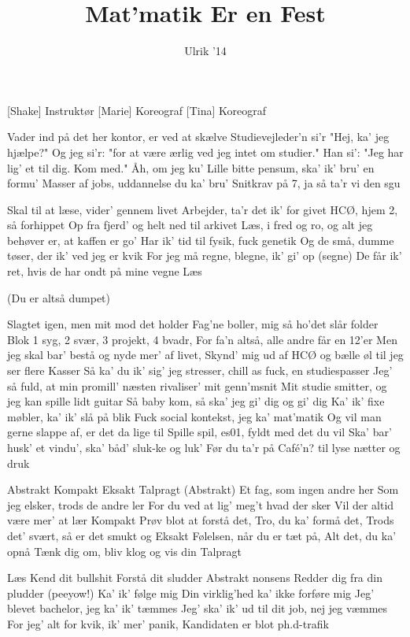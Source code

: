 \documentclass[a4paper,11pt]{article}
\title{Mat'matik Er en Fest}
\author{Ulrik '14}
\begin{document}
\maketitle

\begin{roles}
[Shake] Instruktør
[Marie] Koreograf
[Tina] Koreograf
\end{roles}

\begin{song}
 Vader ind på det her kontor, er ved at skælve
Studievejleder'n si'r "Hej, ka' jeg hjælpe?"
Og jeg si'r: "for at være ærlig ved jeg intet om studier."
Han si': "Jeg har lig' et til dig. Kom med."
Åh, om jeg ku'
Lille bitte pensum, ska' ik' bru' en formu'
Masser af jobs, uddannelse du ka' bru'
Snitkrav på 7, ja så ta'r vi den sgu

 Skal til at læse, vider' gennem livet
Arbejder, ta'r det ik' for givet
HCØ, hjem 2, så forhippet
Op fra fjerd' og helt ned til arkivet
Læs, i fred og ro, og alt jeg behøver er, at kaffen er go' 
Har ik' tid til fysik, fuck genetik
Og de små, dumme tøser, der ik' ved jeg er kvik
For jeg må regne, blegne, ik' gi' op (segne)
De får ik' ret, hvis de har ondt på mine vegne
Læs

 (Du er altså dumpet)

 Slagtet igen, men mit mod det holder
Fag'ne boller, mig så ho'det slår folder
Blok 1 syg, 2 svær, 3 projekt, 4 bvadr,
For fa'n altså, alle andre får en 12'er
Men jeg skal bar' bestå og nyde mer' af livet,
Skynd' mig ud af HCØ og bælle øl til jeg ser flere Kasser
Så ka' du ik' sig' jeg stresser, chill as fuck, en studiespasser
Jeg' så fuld, at min promill' næsten rivaliser' mit genn'msnit
Mit studie smitter, og jeg kan spille lidt guitar
Så baby kom, så ska’ jeg gi’ dig og gi’ dig
Ka' ik' fixe møbler, ka' ik' slå på blik
Fuck social kontekst, jeg ka' mat'matik
Og vil man gerne slappe af, er det da lige til
Spille spil, es01, fyldt med det du vil
Ska' bar' husk' et vindu', ska' båd' sluk-ke og luk'
Før du ta'r på Café'n? til lyse nætter og druk

 Abstrakt
Kompakt
Eksakt
Talpragt (Abstrakt)
Et fag, som ingen andre her
Som jeg elsker, trods de andre ler
For du ved at lig’ meg’t hvad der sker
Vil der altid være mer’ at lær
Kompakt
Prøv blot at forstå det,
Tro, du ka' formå det,
Trods det’ svært, så er det smukt og
Eksakt
Følelsen, når du er tæt på,
Alt det, du ka’ opnå
Tænk dig om, bliv klog og vis din
Talpragt

 Læs
Kend dit bullshit
Forstå dit sludder
Abstrakt nonsens
Redder dig fra din pludder
(peeyow!)
Ka' ik' følge mig
Din virklig'hed ka' ikke forføre mig
Jeg' blevet bachelor, jeg ka' ik' tæmmes
Jeg' ska' ik' ud til dit job, nej jeg væmmes
For jeg' alt for kvik, ik' mer' panik,
Kandidaten er blot ph.d-trafik


\end{song}
\end{document}
